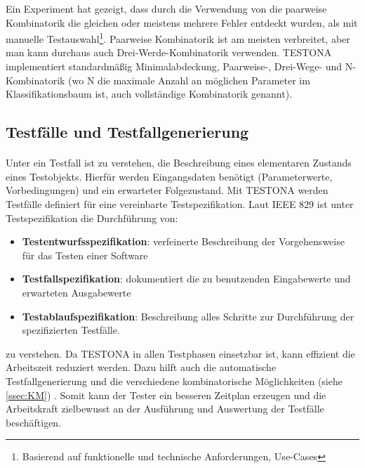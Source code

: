 Ein Experiment hat gezeigt, dass durch die Verwendung von die paarweise Kombinatorik die gleichen oder meistens mehrere Fehler entdeckt wurden, als mit manuelle Testauswahl\footnote{Basierend auf funktionelle und technische Anforderungen, Use-Cases}. Paarweise Kombinatorik ist am meisten verbreitet, aber man kann durchaus auch Drei-Werde-Kombinatorik verwenden. TESTONA implementiert standardmäßig Minimalabdeckung, Paarweise-, Drei-Wege- und N-Kombinatorik (wo N die maximale Anzahl an möglichen Parameter im Klassifikationsbaum ist, auch vollständige Kombinatorik genannt)\cite{CombinatorialSTesting}.\\




\subsection{Testfälle und Testfallgenerierung}
\paragraph{}



Unter ein Testfall ist zu verstehen, die Beschreibung eines elementaren Zustands eines Testobjekts. Hierfür werden Eingangsdaten benötigt (Parameterwerte, Vorbedingungen) und ein erwarteter Folgezustand. Mit TESTONA werden Testfälle definiert für eine vereinbarte Testspezifikation. Laut IEEE 829 ist unter Testspezifikation die Durchführung von:

\begin{itemize}
\item\textbf{ Testentwurfsspezifikation}: verfeinerte Beschreibung der Vorgehensweise für das Testen einer Software
\item \textbf{Testfallspezifikation}: dokumentiert die zu benutzenden Eingabewerte und erwarteten Ausgabewerte
\item \textbf{Testablaufspezifikation}: Beschreibung alles Schritte zur Durchführung der spezifizierten Testfälle.
\end{itemize}

zu verstehen. Da TESTONA in allen Testphasen einsetzbar ist, kann effizient die Arbeitszeit reduziert werden. Dazu hilft auch die automatische Testfallgenerierung und die verschiedene kombinatorische Möglichkeiten (siehe \ref{ssec:KM}) . Somit kann der Tester ein besseren Zeitplan erzeugen und die Arbeitskraft zielbewusst an der Ausführung und Auswertung der Testfälle beschäftigen.\\


